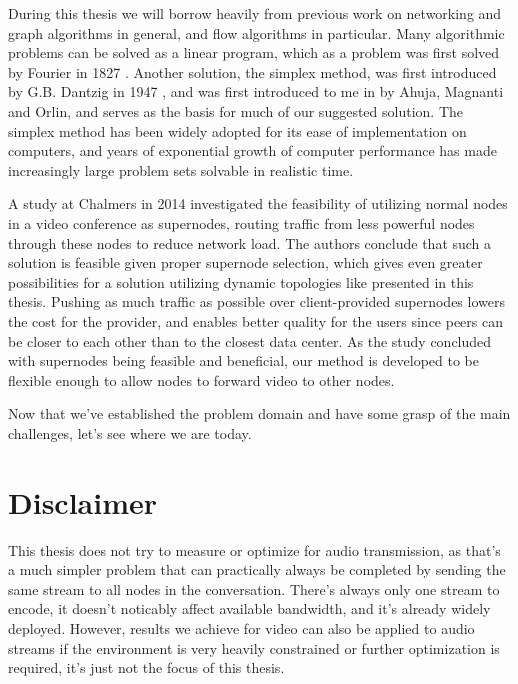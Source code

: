 During this thesis we will borrow heavily from previous work on networking and graph algorithms in general, and flow algorithms in particular. Many algorithmic problems can be solved as a linear program, which as a problem was first solved by Fourier in 1827 \cite{sierksma2001linear}. Another solution, the simplex method, was first introduced by G.B. Dantzig in 1947 \cite{sierksma2001linear}, and was first introduced to me in \cite{ahuja1988network} by Ahuja, Magnanti and Orlin, and serves as the basis for much of our suggested solution. The simplex method has been widely adopted for its ease of implementation on computers, and years of exponential growth of computer performance has made increasingly large problem sets solvable in realistic time.

A study at Chalmers in 2014\cite{tree-topology-webrtc} investigated the feasibility of utilizing normal nodes in a video conference as supernodes, routing traffic from less powerful nodes through these nodes to reduce network load. The authors conclude that such a solution is feasible given proper supernode selection, which gives even greater possibilities for a solution utilizing dynamic topologies like presented in this thesis. Pushing as much traffic as possible over client-provided supernodes lowers the cost for the provider, and enables better quality for the users since peers can be closer to each other than to the closest data center. As the study concluded with supernodes being feasible and beneficial, our method is developed to be flexible enough to allow nodes to forward video to other nodes.

Now that we've established the problem domain and have some grasp of the main challenges, let's see where we are today.


\section{Disclaimer}

This thesis does not try to measure or optimize for audio transmission, as that's a much simpler problem that can practically always be completed by sending the same stream to all nodes in the conversation. There's always only one stream to encode, it doesn't noticably affect available bandwidth, and it's already widely deployed. However, results we achieve for video can also be applied to audio streams if the environment is very heavily constrained or further optimization is required, it's just not the focus of this thesis.
